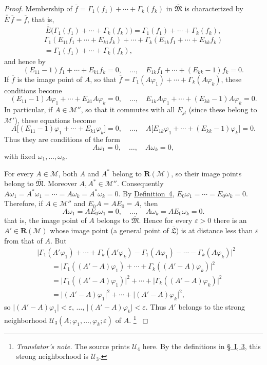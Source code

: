 \documentclass[
  paper=b5,
  twoside=true,
  fontsize=13pt,
  headings=normal,
  bookmarkpackage=false
]{scrartcl}
\theoremstyle{definition}
\newcommand{\GeneratedRing}{\boldsymbol{R}}
\newcommand{\FrakM}{\mathfrak{M}}
\newcommand{\FrakL}{\mathfrak{L}}
\newcounter{translatornote}
\newcounter{savedfootnote}
\newcommand{\TranslatorNote}[1]{%
  \stepcounter{translatornote}%
  \setcounter{savedfootnote}{\value{footnote}}%
  \begingroup
    \renewcommand{\thefootnote}{T\arabic{translatornote}}%
    \footnote{\textit{Translator's note.} #1}%
  \endgroup
  \setcounter{footnote}{\value{savedfootnote}}}
\begin{document}
\begin{proof}
Membership of \(\overline f=\Gamma_1(f_1)+\cdots+\Gamma_k(f_k)\)
in \(\overline{\FrakM}\) is characterized by
\(\overline{\overline E}\,\overline f=\overline f\), that is,
\[
  \overline{\overline E}\bigl(\Gamma_1(f_1)+\cdots+\Gamma_k(f_k)\bigr)
  =\Gamma_1(f_1)+\cdots+\Gamma_k(f_k),
\]
\begin{gather*}
  \Gamma_1(E_{11}f_1+\cdots+E_{k1}f_k)
    +\cdots+\Gamma_k(E_{1k}f_1+\cdots+E_{kk}f_k)\\
  =\Gamma_1(f_1)+\cdots+\Gamma_k(f_k),
\end{gather*}
and hence by
\[
  (E_{11}-1)f_1+\cdots+E_{k1}f_k=0,
  \quad\ldots,\quad
  E_{1k}f_1+\cdots+(E_{kk}-1)f_k=0.
\]
If \(\overline f\) is the image point of \(A\), so that
\(\overline f=\Gamma_1(A\varphi_1)+\cdots+\Gamma_k(A\varphi_k)\),
these conditions become
\[
  (E_{11}-1)A\varphi_1+\cdots+E_{k1}A\varphi_k=0,
  \quad\ldots,\quad
  E_{1k}A\varphi_1+\cdots+(E_{kk}-1)A\varphi_k=0.
\]
In particular, if \(A\in\mathcal M''\), so that it commutes with all
\(E_{jl}\) (since these belong to \(\mathcal M'\)), these equations
become
\[
  A\bigl[(E_{11}-1)\varphi_1+\cdots+E_{k1}\varphi_k\bigr]=0,
  \quad\ldots,\quad
  A\bigl[E_{1k}\varphi_1+\cdots+(E_{kk}-1)\varphi_k\bigr]=0.
\]
Thus they are conditions of the form
\[
  A\omega_1=0,\quad\ldots,\quad A\omega_k=0,
\]
with fixed \(\omega_1,\ldots,\omega_k\).

For every \(A\in\mathcal M\), both \(A\) and \(A^*\) belong to
\(\GeneratedRing (\mathcal M)\), so their image points belong to \(\overline{\FrakM}\).
Moreover \(A,A^*\in\mathcal M''\). Consequently
\(A\omega_1=A^*\omega_1=\cdots=A\omega_k=A^*\omega_k=0\).
By \hyperref[def:principal-unit]{Definition~4},
\(E_0\omega_1=\cdots=E_0\omega_k=0\).
Therefore, if \(A\in\mathcal M''\) and \(E_0A=AE_0=A\), then
\[
  A\omega_1=AE_0\omega_1=0,
  \quad\ldots,\quad
  A\omega_k=AE_0\omega_k=0.
\]
that is, the image point of \(A\) belongs to \(\overline{\FrakM}\).
Hence for every \(\varepsilon>0\) there is an \(A'\in \GeneratedRing (\mathcal M)\)
whose image point (a general point of \(\overline{\FrakL}\)) is at
distance less than \(\varepsilon\) from that of \(A\). But
\begin{align*}
 &\bigl|
   \Gamma_1(A'\varphi_1)+\cdots+\Gamma_k(A'\varphi_k)
   -\Gamma_1(A\varphi_1)-\cdots-\Gamma_k(A\varphi_k)
 \bigr|^2\\
 &\qquad=
 \bigl|
   \Gamma_1((A'-A)\varphi_1)+\cdots+
   \Gamma_k((A'-A)\varphi_k)
 \bigr|^2\\
 &\qquad=
 \bigl|\Gamma_1((A'-A)\varphi_1)\bigr|^2+\cdots+
 \bigl|\Gamma_k((A'-A)\varphi_k)\bigr|^2\\
 &\qquad=
 \bigl|(A'-A)\varphi_1\bigr|^2+\cdots+
 \bigl|(A'-A)\varphi_k\bigr|^2,
\end{align*}
so \(\bigl|(A'-A)\varphi_1\bigr|<\varepsilon\), \(\ldots\),
\(\bigl|(A'-A)\varphi_k\bigr|<\varepsilon\). Thus \(A'\) belongs to the
strong neighborhood
\(\mathcal U_3(A;\varphi_1,\ldots,\varphi_k;\varepsilon)\) of \(A\).\TranslatorNote{The
source prints \(\mathcal U_4\) here. By the definitions in
\hyperref[sec:topologies-3]{\S~I, 3}, this strong neighborhood is
\(\mathcal U_3\).}


\end{proof}
\end{document}
